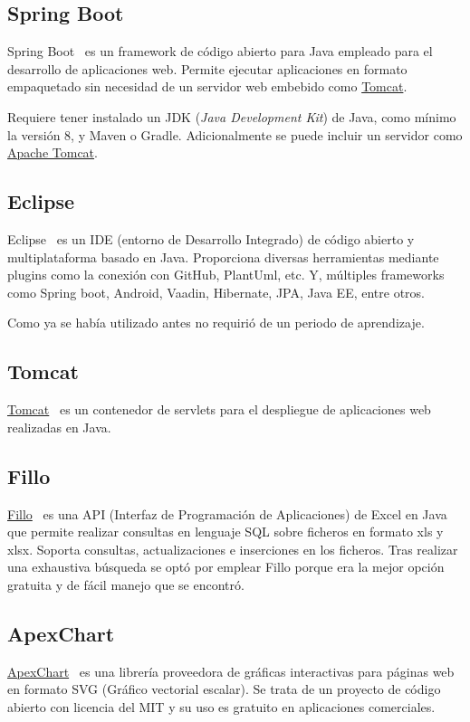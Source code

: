 \subsection{Spring Boot}
Spring Boot~\cite{pagina_springBoot} es un framework de código abierto para Java empleado para el desarrollo de aplicaciones web. Permite ejecutar aplicaciones en formato empaquetado sin necesidad de un servidor web embebido como \href{https://tomcat.apache.org/}{Tomcat}.

Requiere tener instalado un JDK (\textit{Java Development Kit}) de Java, como mínimo la versión 8, y Maven o Gradle. Adicionalmente se puede incluir un servidor como \href{https://tomcat.apache.org/}{Apache Tomcat}.

\subsection{Eclipse}
Eclipse~\cite{pagina_eclipse} es un IDE (entorno de Desarrollo Integrado) de código abierto y multiplataforma basado en Java. Proporciona diversas herramientas mediante plugins como la conexión con GitHub, PlantUml, etc. Y, múltiples frameworks como Spring boot, Android, Vaadin, Hibernate, JPA, Java EE, entre otros.

Como ya se había utilizado antes no requirió de un periodo de aprendizaje.

\subsection{Tomcat}
\href{https://tomcat.apache.org/download-90.cgi}{Tomcat}~\cite{pagina_tomcat} es un contenedor de servlets para el despliegue de aplicaciones web realizadas en Java.

\subsection{Fillo}
\href{https://codoid.com/fillo/}{Fillo}~\cite{pagina_fillo} es una API (Interfaz de Programación de Aplicaciones) de Excel en Java que permite realizar consultas en lenguaje SQL sobre ficheros en formato xls y xlsx. Soporta consultas, actualizaciones e inserciones en los ficheros.  Tras realizar una exhaustiva búsqueda se optó por emplear Fillo porque era la mejor opción gratuita y de fácil manejo que se encontró.

\subsection{ApexChart}
\href{https://apexcharts.com/}{ApexChart}~\cite{pagina_ApexChart} es una librería proveedora de gráficas interactivas para páginas web en formato SVG (Gráfico vectorial escalar).
Se trata de un proyecto de código abierto con licencia del MIT y su uso es gratuito en aplicaciones comerciales.

